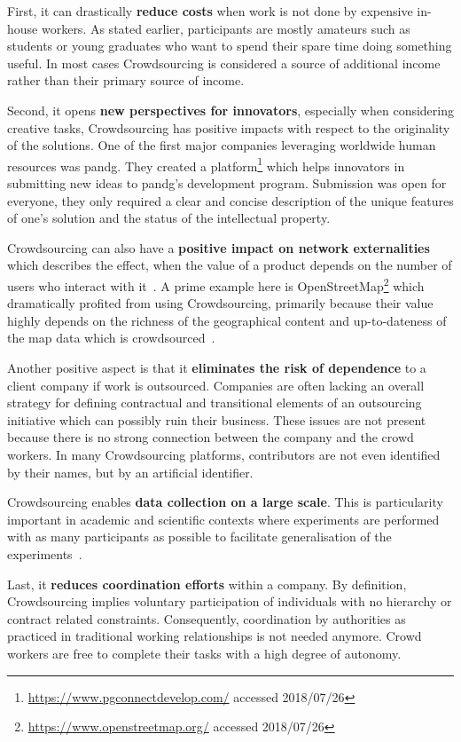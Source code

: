 First, it can drastically \textbf{reduce costs} when work is not done by expensive in-house workers. As stated earlier, participants are mostly amateurs such as students or young graduates who want to spend their spare time doing something useful. In most cases Crowdsourcing is considered a source of additional income rather than their primary source of income. 

Second, it opens \textbf{new perspectives for innovators}, especially when considering creative tasks, Crowdsourcing has positive impacts with respect to the originality of the solutions. One of the first major companies leveraging worldwide human resources was \gls{pandg}. They created a platform\footnote{\url{https://www.pgconnectdevelop.com/} accessed 2018/07/26} which helps innovators in submitting new ideas to \gls{pandg}'s development program. Submission was open for everyone, they only required a clear and concise description of the unique features of one's solution and the status of the intellectual property. 

Crowdsourcing can also have a \textbf{positive impact on network externalities} which describes the effect, when the value of a product depends on the number of users who interact with it~\cite{shapiro1998}. A prime example here is OpenStreetMap\footnote{\url{https://www.openstreetmap.org/} accessed 2018/07/26} which dramatically profited from using Crowdsourcing, primarily because their value highly depends on the richness of the geographical content and up-to-dateness of the map data which is crowdsourced~\cite{chilton2009}. 

Another positive aspect is that it \textbf{eliminates the risk of dependence} to a client company if work is outsourced. Companies are often lacking an overall strategy for defining contractual and transitional elements of an outsourcing initiative which can possibly ruin their business. These issues are not present because there is no strong connection between the company and the crowd workers. In many Crowdsourcing platforms, contributors are not even identified by their names, but by an artificial identifier. 

Crowdsourcing enables \textbf{data collection on a large scale}. This is particularity important in academic and scientific contexts where experiments are performed with as many participants as possible to facilitate generalisation of the experiments~\cite{gadiraju2017}. 

Last, it \textbf{reduces coordination efforts} within a company. By definition, Crowdsourcing implies voluntary participation of individuals with no hierarchy or contract related constraints. Consequently, coordination by authorities as practiced in traditional working relationships is not needed anymore. Crowd workers are free to complete their tasks with a high degree of autonomy. 

